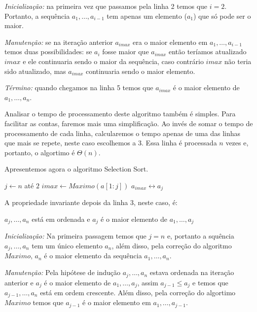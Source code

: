   {\em Inicialização:} na primeira vez que passamos pela linha 2 temos que $i = 2$.
  Portanto, a sequência $a_1, \dots, a_{i-1}$ tem apenas um elemento ($a_1$) que só pode ser o maior.

  {\em Manutenção:} se na iteração anterior $a_{imax}$ era o maior elemento em $a_1, \dots, a_{i-1}$ temos duas possibilidades: se $a_i$ fosse maior que $a_{imax}$ então teríamos atualizado $imax$ e ele continuaria sendo o maior da sequência, caso contrário $imax$ não teria sido atualizado, mas $a_{imax}$ continuaria sendo o maior elemento.

  {\em Término:} quando chegamos na linha 5 temos que $a_{imax}$ é o maior elemento de $a_1, \dots, a_n$.

  \vspace{1em}

  Analisar o tempo de processamento deste algoritmo também é simples.
  Para facilitar as contas, faremos mais uma simplificação.
  Ao invés de somar o tempo de processamento de cada linha, calcularemos o tempo apenas de uma das linhas que mais se repete, neste caso escolhemos a 3.
  Essa linha é processada $n$ vezes e, portanto, o algortimo é $\Theta(n)$.

  Apresentemos agora o algoritmo Selection Sort.

  
  \begin{codebox}
    \li \For $j \gets n$ até $2$
    \li \Do $imax \gets Maximo(a[1:j])$
    \li     \Then $a_{imax} \leftrightarrow a_j$
        \End
  \end{codebox}

  A propriedade invariante depois da linha 3, neste caso, é:
  \begin{center}
    $a_j, \dots, a_n$ está em ordenada e $a_j$ é o maior elemento de $a_1, \dots, a_j$
  \end{center}

  {\em Inicialização:} Na primeira passagem temos que $j=n$ e, portanto a squência $a_j, \dots, a_n$ tem um único elemento $a_n$, além disso, pela correção do algoritmo $Maximo$, $a_n$ é o maior elemento da sequência $a_1, \dots, a_n$.

  {\em Manutenção:} Pela hipótese de indução $a_j, \dots, a_n$ estava ordenada na iteração anterior e $a_j$ é o maior elemento de $a_1, \dots, a_j$, assim $a_{j-1} \leq a_j$ e temos que $a_{j-1}, \dots, a_n$ está em ordem crescente.
  Além disso, pela correção do algortimo $Maximo$ temos que $a_{j-1}$ é o maior elemento em $a_1, \dots, a_{j-1}$.


